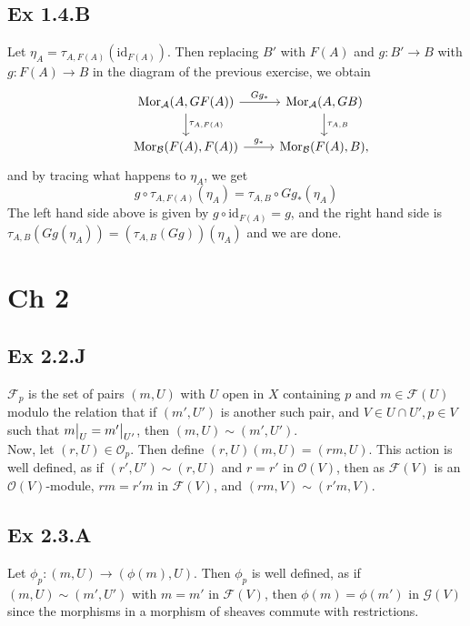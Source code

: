 \documentclass{article}
\newcommand\restr[2]{{%
  \left.\kern-\nulldelimiterspace %
  #1 %
  \vphantom{\big|} %
  \right|_{#2} %
  }}
\theoremstyle{definition}
\newcommand{\Mor}{\text{Mor}}
\newcommand{\id}{\text{id}}
\begin{document}
\subsection*{Ex 1.4.B}

Let $\eta_{A} = \tau_{A, F(A)}(\id_{F(A)})$. Then replacing $B'$ with $F(A)$
and $g : B' \to B$ with $g : F(A) \to B$ in the diagram of the previous exercise,
we obtain
\[
	\begin{tikzcd}
		&
		\Mor_{\mathcal{A}}(A, GF(A))
		\ar[r, "Gg_{*}"]
		\ar[d, "\tau_{A, F(A)}"]
		&
		\Mor_{\mathcal{A}}(A, GB)
		\ar[d, "\tau_{A, B}"] \\
		&
		\Mor_{\mathcal{B}}(F(A), F(A))
		\ar[r, "g_{*}"]
		&
		\Mor_{\mathcal{B}}(F(A), B),
	\end{tikzcd}
\]
and by tracing what happens to $\eta_{A}$, we get
\[
	g \circ \tau_{A, F(A)}(\eta_A)
	=
	\tau_{A, B} \circ Gg_{*}(\eta_{A})
\]
The left hand side above is given by $g \circ \id_{F(A)} = g$, and the right
hand side is $\tau_{A, B}(Gg(\eta_A)) = (\tau_{A, B}(Gg))(\eta_{A})$ and we are
done.


\section*{Ch 2}

\subsection*{Ex 2.2.J}

$\mathcal{F}_{p}$ is the set of pairs $(m, U)$ with $U$ open in $X$ containing
$p$ and $m \in \mathcal{F}(U)$ modulo the relation that if $(m', U')$ is
another such pair, and $V \in U \cap U', p \in V$ such that $\restr{m}{U} =
	\restr{m'}{U'}$, then $(m, U) \sim (m', U')$. \\

Now, let $(r, U) \in \mathcal{O}_p$. Then define $(r, U) (m, U) = (rm, U)$.
This action is well defined, as if $(r', U') \sim (r, U)$ and $r = r'$ in
$\mathcal{O}(V)$, then as $\mathcal{F}(V)$ is an $\mathcal{O}(V)$-module, $rm =
	r'm$ in $\mathcal{F}(V)$, and $(rm, V) \sim (r'm, V)$.


\subsection*{Ex 2.3.A}

Let $\phi_p : (m, U) \to (\phi(m), U)$. Then $\phi_p$ is well defined, as if
$(m, U) \sim (m', U')$ with $m = m'$ in $\mathcal{F}(V)$, then $\phi(m) =
	\phi(m')$ in $\mathcal{G}(V)$ since the morphisms in a morphism of sheaves
commute with restrictions.
\end{document}
